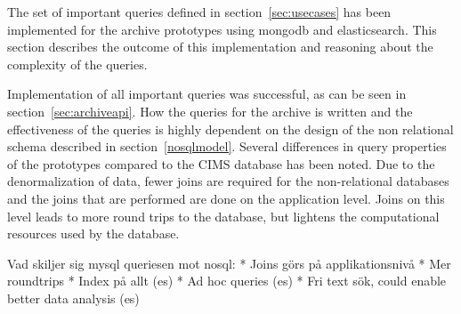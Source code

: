 The set of important queries defined in section~\ref{sec:usecases} has been implemented for the archive prototypes using mongodb and elasticsearch. This section describes the outcome of this implementation and reasoning about the complexity of the queries.  

Implementation of all important queries was successful, as can be seen in section~\ref{sec:archiveapi}. How the queries for the archive is written and the effectiveness of the queries is highly dependent on the design of the non relational schema described in section~\ref{nosqlmodel}. Several differences in query properties of the prototypes compared to the CIMS database has been noted. Due to the denormalization of data, fewer joins are required for the non-relational databases and the joins that are performed are done on the application level. Joins on this level leads to more round trips to the database, but lightens the computational resources used by the database.




Vad skiljer sig mysql queriesen mot nosql:
    * Joins görs på applikationsnivå
    * Mer roundtrips
    * Index på allt (es)
    * Ad hoc queries (es)
    * Fri text sök, could enable better data analysis (es)

